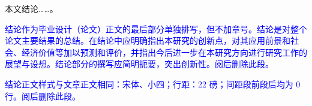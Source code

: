 


本文结论……。\cite{李成智2004飞行之梦}

\textcolor{blue}{结论作为毕业设计（论文）正文的最后部分单独排写，但不加章号。结论是对整个论文主要结果的总结。在结论中应明确指出本研究的创新点，对其应用前景和社会、经济价值等加以预测和评价，并指出今后进一步在本研究方向进行研究工作的展望与设想。结论部分的撰写应简明扼要，突出创新性。阅后删除此段。}

\textcolor{blue}{结论正文样式与文章正文相同：宋体、小四；行距：22 磅；间距段前段后均为 0 行。阅后删除此段。}
